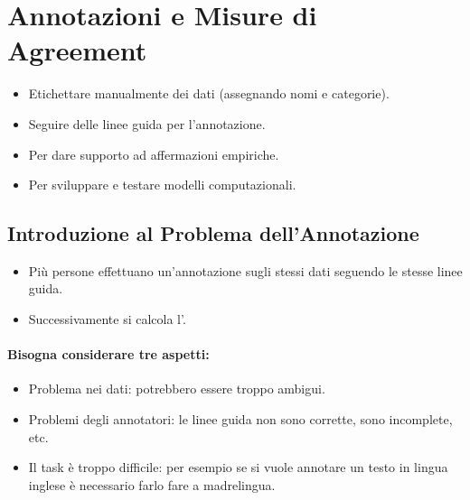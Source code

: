 \section{Annotazioni e Misure di Agreement}


\begin{itemize}
  \item Etichettare manualmente dei dati (assegnando nomi e categorie). 
  \item Seguire delle linee guida per l'annotazione.
\end{itemize}


\begin{itemize}
  \item Per dare supporto ad affermazioni empiriche. 
  \item Per sviluppare e testare modelli computazionali.
\end{itemize}


\subsection{Introduzione al Problema dell'Annotazione}


\begin{itemize}
  \item Più persone effettuano un'annotazione sugli stessi dati seguendo le stesse linee guida. 
  \item Successivamente si calcola l'. 
\end{itemize}


\paragraph{Bisogna considerare tre aspetti:}

\begin{itemize}
  \item Problema nei dati: potrebbero essere troppo ambigui. 
  \item Problemi degli annotatori: le linee guida non sono corrette, sono incomplete, etc. 
  \item Il task è troppo difficile: per esempio se si vuole annotare un testo in lingua inglese è necessario farlo fare a madrelingua.
\end{itemize}

